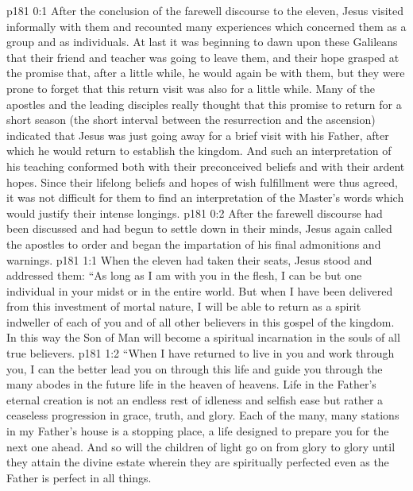 \author{Midwayer Commission}
\vs p181 0:1 After the conclusion of the farewell discourse to the eleven, Jesus visited informally with them and recounted many experiences which concerned them as a group and as individuals. At last it was beginning to dawn upon these Galileans that their friend and teacher was going to leave them, and their hope grasped at the promise that, after a little while, he would again be with them, but they were prone to forget that this return visit was also for a little while. Many of the apostles and the leading disciples really thought that this promise to return for a short season (the short interval between the resurrection and the ascension) indicated that Jesus was just going away for a brief visit with his Father, after which he would return to establish the kingdom. And such an interpretation of his teaching conformed both with their preconceived beliefs and with their ardent hopes. Since their lifelong beliefs and hopes of wish fulfillment were thus agreed, it was not difficult for them to find an interpretation of the Master’s words which would justify their intense longings.
\vs p181 0:2 After the farewell discourse had been discussed and had begun to settle down in their minds, Jesus again called the apostles to order and began the impartation of his final admonitions and warnings.
\vs p181 1:1 When the eleven had taken their seats, Jesus stood and addressed them: \textcolor{ubdarkred}{“As long as I am with you in the flesh, I can be but one individual in your midst or in the entire world. But when I have been delivered from this investment of mortal nature, I will be able to return as a spirit indweller of each of you and of all other believers in this gospel of the kingdom. In this way the Son of Man will become a spiritual incarnation in the souls of all true believers.}
\vs p181 1:2 \textcolor{ubdarkred}{“When I have returned to live in you and work through you, I can the better lead you on through this life and guide you through the many abodes in the future life in the heaven of heavens. Life in the Father’s eternal creation is not an endless rest of idleness and selfish ease but rather a ceaseless progression in grace, truth, and glory. Each of the many, many stations in my Father’s house is a stopping place, a life designed to prepare you for the next one ahead. And so will the children of light go on from glory to glory until they attain the divine estate wherein they are spiritually perfected even as the Father is perfect in all things.}
